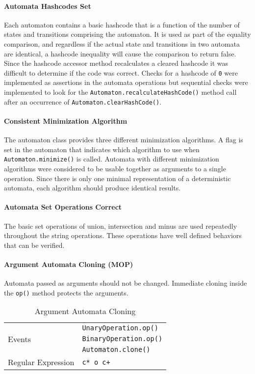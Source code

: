 \documentclass[letterpaper,sigplan]{acmart}
\begin{document}
\paragraph{Automata Hashcodes Set} Each automaton contains a basic hashcode
that is a function of the number of states and transitions comprising the
automaton.  It is used as part of the equality comparison, and regardless if
the actual state and transitions in two automata are identical, a hashcode
inequality will cause the comparison to return false.  Since the hashcode
accessor method recalculates a cleared hashcode it was difficult to determine
if the code was correct.  Checks for a hashcode of \lstinline{0} were
implemented as assertions in the automata operations but sequential checks were
implemented to look for the \lstinline{Automaton.recalculateHashCode()} method
call after an occurrence of \lstinline{Automaton.clearHashCode()}.

\paragraph{Consistent Minimization Algorithm} The automaton class provides
three different minimization algorithms.  A flag is set in the automaton that
indicates which algorithm to use when \lstinline{Automaton.minimize()} is
called.  Automata with different minimization algorithms were considered to be
usable together as arguments to a single operation.  Since there is only one
minimal representation of a deterministic automata, each algorithm should
produce identical results.

\paragraph{Automata Set Operations Correct} The basic set operations of union,
intersection and minus are used repeatedly throughout the string operations.
These operations have well defined behaviors that can be verified.

\paragraph{Argument Automata Cloning (MOP)} Automata passed as arguments should
not be changed.  Immediate cloning inside the \lstinline{op()} method protects
the arguments.

\begin{table}[h]
  {\footnotesize
    \begin{tabular}{ll}
      \toprule
      \multirow{3}{*}{Events} & \texttt{UnaryOperation.op()} \\
                              & \texttt{BinaryOperation.op()} \\
                              & \texttt{Automaton.clone()} \\
      \midrule
      Regular Expression & \texttt{c* o c+} \\
      \bottomrule
    \end{tabular}
    \caption{Argument Automata Cloning}%
    \label{tab:arg-automata-clone}
  }
\end{table}
\end{document}
